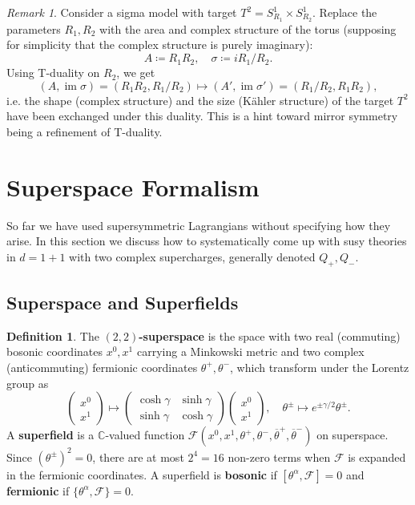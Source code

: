 \documentclass{report}
\theoremstyle{plain}
\theoremstyle{definition}
\newtheorem{definition}[theorem]{Definition}
\theoremstyle{remark}
\newtheorem*{remark}{Remark}
\newcommand{\bC}{\mathbb{C}}
\newcommand{\cF}{\mathcal{F}}
\DeclareMathOperator{\im}{im}
\newcommand{\cnj}{\overline}
\begin{document}
\begin{remark}
  Consider a sigma model with target $T^2 = S^1_{R_1} \times
  S^1_{R_2}$. Replace the parameters $R_1, R_2$ with the area and
  complex structure of the torus (supposing for simplicity that the
  complex structure is purely imaginary):
  \[ A \coloneqq R_1R_2, \quad \sigma \coloneqq iR_1/R_2. \]
  Using T-duality on $R_2$, we get
  \[ (A, \im \sigma) = (R_1R_2, R_1/R_2) \mapsto (A', \im \sigma') = (R_1/R_2, R_1R_2), \]
  i.e. the shape (complex structure) and the size (K\"ahler structure)
  of the target $T^2$ have been exchanged under this duality. This is
  a hint toward mirror symmetry being a refinement of T-duality.
\end{remark}

\section{Superspace Formalism}

So far we have used supersymmetric Lagrangians without specifying how
they arise. In this section we discuss how to systematically come up
with susy theories in $d=1+1$ with two complex supercharges, generally
denoted $Q_+, Q_-$.

\subsection{Superspace and Superfields}

\begin{definition}
  The {\bf $(2,2)$-superspace} is the space with two real (commuting)
  bosonic coordinates $x^0, x^1$ carrying a Minkowski metric and two
  complex (anticommuting) fermionic coordinates $\theta^+, \theta^-$,
  which transform under the Lorentz group as
  \[ \begin{pmatrix} x^0 \\ x^1 \end{pmatrix} \mapsto \begin{pmatrix} \cosh \gamma & \sinh \gamma \\ \sinh \gamma & \cosh \gamma \end{pmatrix} \begin{pmatrix} x^0 \\ x^1 \end{pmatrix}, \quad \theta^\pm \mapsto e^{\pm \gamma/2} \theta^\pm. \]
  A {\bf superfield} is a $\bC$-valued function $\cF(x^0, x^1,
  \theta^+, \theta^-, \cnj\theta^+, \cnj\theta^-)$ on superspace.
  Since $(\theta^\pm)^2 = 0$, there are at most $2^4 = 16$ non-zero
  terms when $\cF$ is expanded in the fermionic coordinates. A
  superfield is {\bf bosonic} if $[\theta^\alpha, \cF] = 0$ and {\bf
    fermionic} if $\{\theta^\alpha, \cF\} = 0$.
\end{definition}
\end{document}
